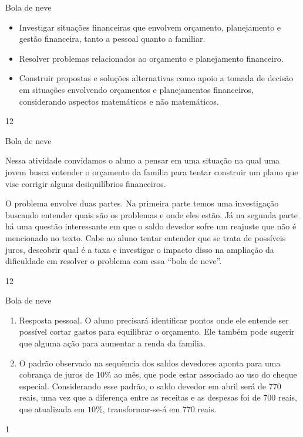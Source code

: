 \clearpage
\begin{objectives}{Bola de neve}
{
\begin{itemize}
\item Investigar situações financeiras que envolvem orçamento, planejamento e gestão financeira, tanto a pessoal quanto a familiar.
\item Resolver problemas relacionados ao orçamento e planejamento financeiro. 
\item Construir propostas e soluções alternativas como apoio a tomada de decisão em situações envolvendo orçamentos e planejamentos financeiros, considerando aspectos matemáticos e não matemáticos. 
\end{itemize}
}{1}{2}
\end{objectives}
\begin{sugestions}{Bola de neve}
{
Nessa atividade convidamos o aluno a pensar em uma situação na qual uma jovem busca entender o orçamento da família para tentar construir um plano que vise corrigir alguns desiquilíbrios financeiros.

O problema envolve duas partes. Na primeira parte temos uma investigação buscando entender quais são os problemas e onde eles estão. Já na segunda parte há uma questão interessante em que o saldo devedor sofre um reajuste que não é mencionado no texto. Cabe ao aluno tentar entender que se trata de possíveis juros, descobrir qual é a taxa e investigar o impacto disso na ampliação da dificuldade em resolver o problema com essa “bola de neve”. 

}{1}{2}
\end{sugestions}
\begin{answer}{Bola de neve}
{
\begin{enumerate}
\item Resposta pessoal. O aluno precisará identificar pontos onde ele entende ser possível cortar gastos para equilibrar o orçamento. Ele também pode sugerir que alguma ação para aumentar a renda da família.
\item O padrão observado na sequência dos saldos devedores aponta para uma cobrança de juros de $10\%$ ao mês, que pode estar associado ao uso do cheque especial. Considerando esse padrão, o saldo devedor em abril será de 770 reais, uma vez que a diferença entre as receitas e as despesas foi de 700 reais, que atualizada em $10\%$, transformar-se-á em $770$ reais.
\end{enumerate}
}{1}
\end{answer}
